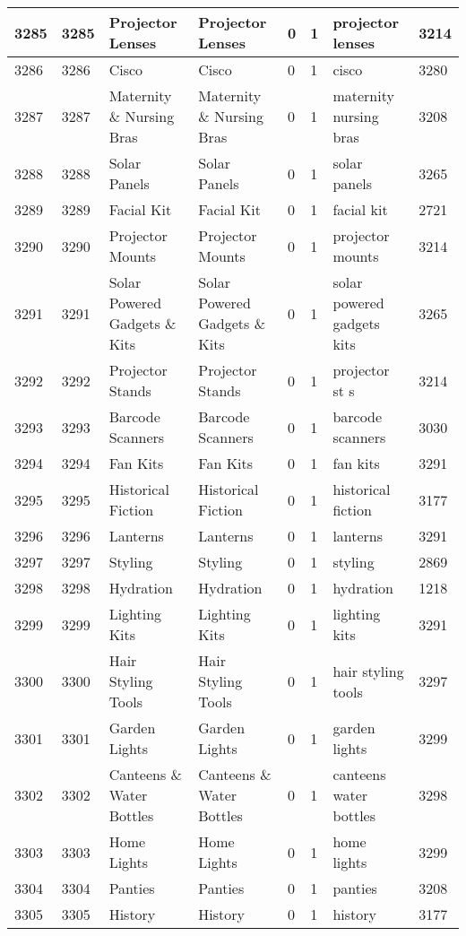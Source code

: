 \begin{longtable}{|l|l|l|l|l|l|l|l|}
3285 & 3285 & Projector Lenses & Projector Lenses & 0 & 1 & projector lenses & 3214 \\ \hline 
3286 & 3286 & Cisco & Cisco & 0 & 1 & cisco & 3280 \\ \hline 
3287 & 3287 & Maternity \& Nursing Bras & Maternity \& Nursing Bras & 0 & 1 & maternity nursing bras & 3208 \\ \hline 
3288 & 3288 & Solar Panels & Solar Panels & 0 & 1 & solar panels & 3265 \\ \hline 
3289 & 3289 & Facial Kit & Facial Kit & 0 & 1 & facial kit & 2721 \\ \hline 
3290 & 3290 & Projector Mounts & Projector Mounts & 0 & 1 & projector mounts & 3214 \\ \hline 
3291 & 3291 & Solar Powered Gadgets \& Kits & Solar Powered Gadgets \& Kits & 0 & 1 & solar powered gadgets kits & 3265 \\ \hline 
3292 & 3292 & Projector Stands & Projector Stands & 0 & 1 & projector st s & 3214 \\ \hline 
3293 & 3293 & Barcode Scanners & Barcode Scanners & 0 & 1 & barcode scanners & 3030 \\ \hline 
3294 & 3294 & Fan Kits & Fan Kits & 0 & 1 & fan kits & 3291 \\ \hline 
3295 & 3295 & Historical Fiction & Historical Fiction & 0 & 1 & historical fiction & 3177 \\ \hline 
3296 & 3296 & Lanterns & Lanterns & 0 & 1 & lanterns & 3291 \\ \hline 
3297 & 3297 & Styling & Styling & 0 & 1 & styling & 2869 \\ \hline 
3298 & 3298 & Hydration & Hydration & 0 & 1 & hydration & 1218 \\ \hline 
3299 & 3299 & Lighting Kits & Lighting Kits & 0 & 1 & lighting kits & 3291 \\ \hline 
3300 & 3300 & Hair Styling Tools & Hair Styling Tools & 0 & 1 & hair styling tools & 3297 \\ \hline 
3301 & 3301 & Garden Lights & Garden Lights & 0 & 1 & garden lights & 3299 \\ \hline 
3302 & 3302 & Canteens \& Water Bottles & Canteens \& Water Bottles & 0 & 1 & canteens water bottles & 3298 \\ \hline 
3303 & 3303 & Home Lights & Home Lights & 0 & 1 & home lights & 3299 \\ \hline 
3304 & 3304 & Panties & Panties & 0 & 1 & panties & 3208 \\ \hline 
3305 & 3305 & History & History & 0 & 1 & history & 3177 \\ \hline 

\end{longtable}
